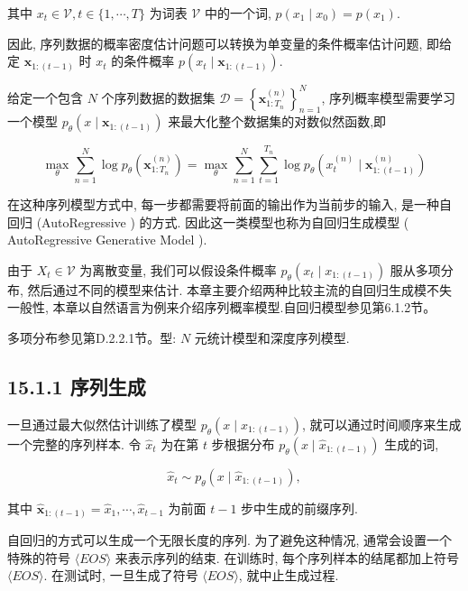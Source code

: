 \documentclass[10pt]{article}
\begin{document}
其中 $x_{t} \in \mathcal{V}, t \in\{1, \cdots, T\}$ 为词表 $\mathcal{V}$ 中的一个词, $p\left(x_{1} \mid x_{0}\right)=p\left(x_{1}\right)$.

因此, 序列数据的概率密度估计问题可以转换为单变量的条件概率估计问题, 即给定 $\boldsymbol{x}_{1:(t-1)}$ 时 $x_{t}$ 的条件概率 $p\left(x_{t} \mid \boldsymbol{x}_{1:(t-1)}\right)$.

给定一个包含 $N$ 个序列数据的数据集 $\mathcal{D}=\left\{\boldsymbol{x}_{1: T_{n}}^{(n)}\right\}_{n=1}^{N}$, 序列概率模型需要学习一个模型 $p_{\theta}\left(x \mid \boldsymbol{x}_{1:(t-1)}\right)$ 来最大化整个数据集的对数似然函数,即


\begin{equation*}
\max _{\theta} \sum_{n=1}^{N} \log p_{\theta}\left(\boldsymbol{x}_{1: T_{n}}^{(n)}\right)=\max _{\theta} \sum_{n=1}^{N} \sum_{t=1}^{T_{n}} \log p_{\theta}\left(x_{t}^{(n)} \mid \boldsymbol{x}_{1:(t-1)}^{(n)}\right) \tag{15.5}
\end{equation*}


在这种序列模型方式中, 每一步都需要将前面的输出作为当前步的输入, 是一种自回归 (AutoRegressive ) 的方式. 因此这一类模型也称为自回归生成模型 ( AutoRegressive Generative Model ).

由于 $X_{t} \in \mathcal{V}$ 为离散变量, 我们可以假设条件概率 $p_{\theta}\left(x_{t} \mid x_{1:(t-1)}\right)$ 服从多项分布, 然后通过不同的模型来估计. 本章主要介绍两种比较主流的自回归生成模不失一般性, 本章以自然语言为例来介绍序列概率模型.自回归模型参见第6.1.2节。

多项分布参见第D.2.2.1节。型: $N$ 元统计模型和深度序列模型.

\subsection*{15.1.1 序列生成}
一旦通过最大似然估计训练了模型 $p_{\theta}\left(x \mid x_{1:(t-1)}\right)$, 就可以通过时间顺序来生成一个完整的序列样本. 令 $\hat{x}_{t}$ 为在第 $t$ 步根据分布 $p_{\theta}\left(x \mid \hat{x}_{1:(t-1)}\right)$ 生成的词,


\begin{equation*}
\hat{x}_{t} \sim p_{\theta}\left(x \mid \hat{x}_{1:(t-1)}\right), \tag{15.6}
\end{equation*}


其中 $\hat{\boldsymbol{x}}_{1:(t-1)}=\hat{x}_{1}, \cdots, \hat{x}_{t-1}$ 为前面 $t-1$ 步中生成的前缀序列.

自回归的方式可以生成一个无限长度的序列. 为了避免这种情况, 通常会设置一个特殊的符号 $\langle E O S\rangle$ 来表示序列的结束. 在训练时, 每个序列样本的结尾都加上符号 $\langle E O S\rangle$. 在测试时, 一旦生成了符号 $\langle E O S\rangle$, 就中止生成过程.
\end{document}
